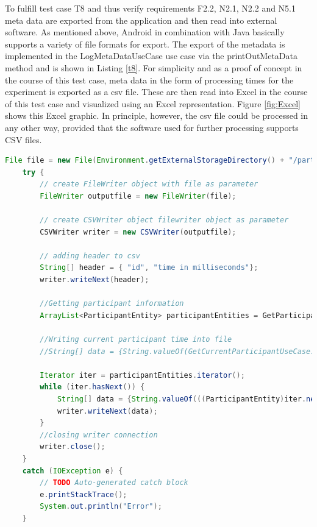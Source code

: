 To fulfill test case T8 and thus verify requirements F2.2, N2.1, N2.2 and N5.1 meta data are exported from the application and then read into external software. As mentioned above, Android in combination with Java basically supports a variety of file formats for export. The export of the metadata is implemented in the LogMetaDataUseCase use case via the printOutMetaData method and is shown in Listing \ref{t8}. For simplicity and as a proof of concept in the course of this test case, meta data in the form of processing times for the experiment is exported as a \ac{csv} file. These are then read into Excel in the course of this test case and visualized using an Excel representation. Figure \ref{fig:Excel} shows this Excel graphic. In principle, however, the \ac{csv}  file could be processed in any other way, provided that the software used for further processing supports CSV files. 

\vspace{0.5cm}

\begin{lstlisting}[language=java,label=t8,lineskip={0pt}, caption=T8: Result Collection and Export, basicstyle=\scriptsize, captionpos=b]
    File file = new File(Environment.getExternalStorageDirectory() + "/participant" + GetCurrentParticipantUseCase.getInstance().getCurrentParticipant() + "TimeData.csv");
    try {
        // create FileWriter object with file as parameter
        FileWriter outputfile = new FileWriter(file);

        // create CSVWriter object filewriter object as parameter
        CSVWriter writer = new CSVWriter(outputfile);

        // adding header to csv
        String[] header = { "id", "time in milliseconds"};
        writer.writeNext(header);

        //Getting participant information
        ArrayList<ParticipantEntity> participantEntities = GetParticipantDataUseCase.getInstance().getParticipantData();

        //Writing current participant time into file
        //String[] data = {String.valueOf(GetCurrentParticipantUseCase.getInstance().getCurrentParticipant()), String.valueOf(timeDifference)};

        Iterator iter = participantEntities.iterator();
        while (iter.hasNext()) {
            String[] data = {String.valueOf(((ParticipantEntity)iter.next()).getId()), String.valueOf(((ParticipantEntity)iter.next()).getExperimentTime())};
            writer.writeNext(data);
        }
        //closing writer connection
        writer.close();
    }
    catch (IOException e) {
        // TODO Auto-generated catch block
        e.printStackTrace();
        System.out.println("Error");
    }
\end{lstlisting}

